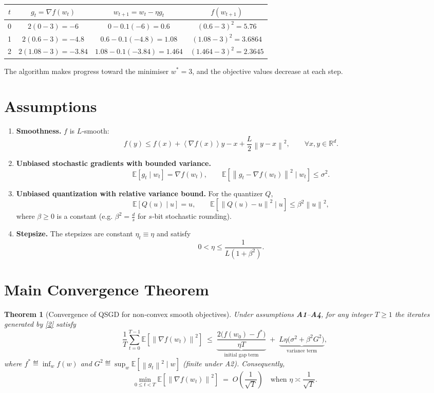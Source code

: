 \documentclass{article}
\newtheorem{theorem}{Theorem}
\newcommand{\E}{\mathbb{E}}
\newcommand{\norm}[1]{\left\lVert#1\right\rVert}
\newcommand{\inner}[1]{\left\langle#1\right\rangle}
\begin{document}
\begin{center}
\begin{tabular}{c|c|c|c}
$t$ & $g_{t}= \nabla f(w_{t})$ & $w_{t+1}=w_{t}-\eta g_{t}$ & $f(w_{t+1})$ \\ \hline
0 & $2(0-3)=-6$ & $0-0.1(-6)=0.6$ & $(0.6-3)^{2}=5.76$\\
1 & $2(0.6-3)=-4.8$ & $0.6-0.1(-4.8)=1.08$ & $(1.08-3)^{2}=3.6864$\\
2 & $2(1.08-3)=-3.84$ & $1.08-0.1(-3.84)=1.464$ & $(1.464-3)^{2}=2.3645$\\
\end{tabular}
\end{center}

The algorithm makes progress toward the minimiser $w^{*}=3$, and the objective values decrease at each step.

\newpage
\section*{Assumptions}
\begin{enumerate}[label={A\arabic*}:,leftmargin=*,align=left]
\item \textbf{Smoothness.} $f$ is $L$‑smooth:
\[
f(y)\le f(x)+\inner{\nabla f(x)}{y-x}+\frac{L}{2}\norm{y-x}^{2},
\qquad\forall x,y\in\mathbb{R}^{d}.
\tag{A1}
\]

\item \textbf{Unbiased stochastic gradients with bounded variance.}
\[
\E[g_{t}\mid w_{t}]=\nabla f(w_{t}),\qquad
\E\!\left[\norm{g_{t}-\nabla f(w_{t})}^{2}\mid w_{t}\right]\le\sigma^{2}.
\tag{A2}
\]

\item \textbf{Unbiased quantization with relative variance bound.}
For the quantizer $Q$,
\[
\E[Q(u)\mid u]=u,\qquad
\E\!\left[\norm{Q(u)-u}^{2}\mid u\right]\le\beta^{2}\norm{u}^{2},
\tag{A3}
\]
where $\beta\ge0$ is a constant (e.g. $\beta^{2}= \frac{d}{s}$ for $s$‑bit stochastic rounding).

\item \textbf{Stepsize.} The stepsizes are constant $\eta_{t}\equiv\eta$ and satisfy
\[
0<\eta\le\frac{1}{L(1+\beta^{2})}.
\tag{A4}
\]
\end{enumerate}

\section*{Main Convergence Theorem}
\begin{theorem}[Convergence of QSGD for non‑convex smooth objectives]\label{thm:main}
Under assumptions \textbf{A1}–\textbf{A4}, for any integer $T\ge1$ the iterates generated by \eqref{2} satisfy
\[
\frac{1}{T}\sum_{t=0}^{T-1}\E\!\left[\norm{\nabla f(w_{t})}^{2}\right]
\;\le\;
\underbrace{\frac{2\bigl(f(w_{0})-f^{*}\bigr)}{\eta T}}_{\text{initial gap term}}
\;+\;
\underbrace{L\eta\bigl(\sigma^{2}+ \beta^{2}G^{2}\bigr)}_{\text{variance term}},
\tag{3}
\]
where $f^{*}\eqdef\inf_{w}f(w)$ and $G^{2}\eqdef\sup_{w}\E\!\left[\norm{g_{t}}^{2}\mid w\right]$ (finite under A2). Consequently,
\[
\min_{0\le t<T}\E\!\left[\norm{\nabla f(w_{t})}^{2}\right]
\;=\;O\!\left(\frac{1}{\sqrt{T}}\right)
\quad\text{when }\eta\asymp\frac{1}{\sqrt{T}}.
\]
\end{theorem}
\end{document}
